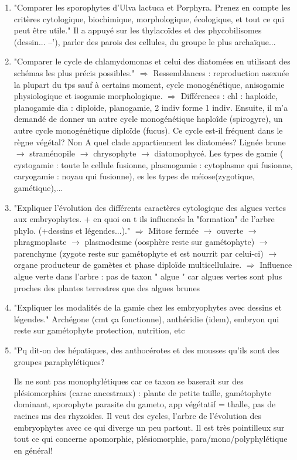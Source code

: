 \begin{enumerate}
	\item "Comparer les sporophytes d’Ulva lactuca et Porphyra. Prenez en compte les critères cytologique, biochimique, morphologique, écologique, et tout ce qui peut être utile." Il a appuyé sur les thylacoïdes et des phycobilisomes (dessin... --'), parler des parois des cellules, du groupe le plus archaïque...

	\item "Comparer le cycle de chlamydomonas et celui des diatomées en utilisant des schémas les plus précis possibles."
 $\Rightarrow$ Ressemblances : reproduction asexuée la plupart du tps sauf à certains moment, cycle monogénétique, anisogamie physiologique et isogamie morphologique.
 $\Rightarrow$ Différences : chl : haploide, planogamie dia : diploide, planogamie, 2 indiv forme 1 indiv. 
Ensuite, il m'a demandé de donner un autre cycle monogénétique haploîde (spirogyre), un autre cycle monogénétique diploïde (fucus). 
Ce cycle est-il fréquent dans le règne végétal? Non
 A quel clade appartiennent les diatomées? Lignée brune  $\rightarrow$ straménopile $\rightarrow$ chrysophyte $\rightarrow$ diatomophycé. Les types de gamie ( cystogamie : toute le cellule fusionne, plasmogamie : cytoplasme qui fusionne, caryogamie : noyau qui fusionne),  es les types de méiose(zygotique, gamétique),...

	\item "Expliquer l'évolution des différents caractères  cytologique des algues vertes aux embryophytes. + en quoi on t ils influencés la "formation" de l'arbre phylo. (+dessins et légendes...)."
$\Rightarrow$ Mitose fermée $\rightarrow$ ouverte $\rightarrow$ phragmoplaste $\rightarrow$ plasmodesme (oosphère reste sur gamétophyte) $\rightarrow$ parenchyme (zygote reste sur gamétophyte et est nourrit par celui-ci) $\rightarrow$ organe producteur de gamètes et phase diploïde multicellulaire.
$\Rightarrow$ Influence algue verte dans l’arbre : pas de taxon " algue " car algues vertes sont plus proches des plantes terrestres que des algues brunes

	\item "Expliquer les modalités de la gamie chez les embryophytes avec dessins et légendes." Archégone (cmt ça fonctionne), anthéridie (idem), embryon qui reste sur gamétophyte protection, nutrition, etc

	\item "Pq dit-on des hépatiques, des anthocérotes et des mousses qu'ils sont des groupes paraphylétiques?

Ils ne sont pas monophylétiques car ce taxon se baserait sur des plésiomorphies (carac ancestraux) : plante de petite taille, gamétophyte dominant, sporophyte parasite du gameto, app végétatif = thalle, pas de racines ms des rhyzoides. Il veut des cycles, l'arbre de l'évolution des embryophytes avec ce qui diverge un peu partout. Il est très pointilleux sur tout ce qui concerne apomorphie, plésiomorphie, para/mono/polyphylétique en général!


\end{enumerate}
